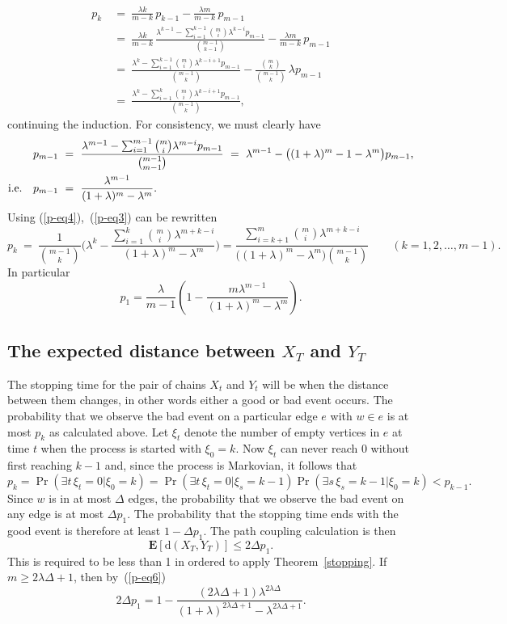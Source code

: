 \documentclass[11pt]{article}
\theoremstyle{definition}
\theoremstyle{remark}
\newcommand{\e}{\mathbf{E}}
\begin{document}
\begin{align*}
    p_k\ &=\ \frac{\lambda k}{m-k}\, p_{k-1}-\frac{\lambda m}{m-k}\,p_{m-1}\\
    &=\ \frac{\lambda k}{m-k}\, \frac{\lambda^{k-1}-\sum_{i=1}^{k-1}
    \binom{m}{i}\lambda^{k-i}p_{m-1}}{\binom{m-1}{k-1}}-\frac{\lambda m}{m-k}\,p_{m-1}\\
    &=\ \frac{\lambda^k-\sum_{i=1}^{k-1} \binom{m}{i}\lambda^{k-i+1}p_{m-1}}{\binom{m-1}{k}}
    - \frac{\binom{m}{k}}{\binom{m-1}{k}}\,\lambda p_{m-1}\\
    &=\ \frac{\lambda^k-\sum_{i=1}^{k} \binom{m}{i}\lambda^{k-i+1}p_{m-1}}{\binom{m-1}{k}},
\end{align*}
continuing the induction. For consistency, we must clearly have
\begin{align}
    p_{m-1}\ &=\ \frac{\lambda^{m-1}-\sum_{i=1}^{m-1}
    \binom{m}{i}\lambda^{m-i}p_{m-1}}{\binom{m-1}{m-1}}
    \ =\ \lambda^{m-1}-\big((1+\lambda)^m-1-\lambda^m\big)p_{m-1},\notag\\
    \textrm{i.e.}\quad p_{m-1}\ &=\ \frac{\lambda^{m-1}}{(1+\lambda)^m-\lambda^m}.\label{p-eq4}
\end{align}%
Using (\ref{p-eq4}),~(\ref{p-eq3}) can be rewritten
\begin{equation}\label{p-eq5}
    p_k\ =\ \frac{1}{\binom{m-1}{k}}\bigg(\lambda^k-\frac{\sum_{i=1}^k
    \binom{m}{i}\lambda^{m+k-i}}{(1+\lambda)^m-\lambda^m}\bigg)
    = \frac{\sum_{i=k+1}^m \binom{m}{i}\lambda^{m+k-i}}
    {\big((1+\lambda)^m-\lambda^m\big)\binom{m-1}{k}}
\qquad(k=1,2,\ldots,m-1).
\end{equation}%
In particular
\begin{equation}\label{p-eq6}
p_1= \frac{\lambda}{m-1}\left(1-\frac{m\lambda^{m-1}}
{(1+\lambda)^m-\lambda^m}\right).
\end{equation}

\subsection{The expected distance between $X_T$ and $Y_T$}
The stopping time for the pair of chains $X_t$ and $Y_t$ will be when the
distance between them changes, in other words either a good or bad event
occurs. The probability that we observe the bad event on a particular edge
$e$ with $w\in e$ is at most $p_k$ as calculated above. Let $\xi_t$ denote
the number of empty vertices in $e$ at time $t$ when the process is started
with $\xi_0=k$. Now $\xi_t$ can never reach 0 without first reaching $k-1$
and, since the process is Markovian, it follows that
\[p_k= \Pr(\exists t\, \xi_t=0 | \xi_0=k)
= \Pr(\exists t\,\xi_t=0 | \xi_{s}=k-1)\Pr(\exists s\,\xi_{s}=k-1 | \xi_{0}=k)
< p_{k-1}.\]%
Since $w$ is in at most $\Delta$ edges, the probability that we observe the
bad event on any edge is at most $\Delta p_1$. The probability that the
stopping time ends with the good event is therefore at least $1-\Delta
p_1$.  The path coupling
calculation is then%
\[\e[\mathrm{d}(X_T,Y_T)]\leq 2\Delta p_1.\]
This is required to be less than 1 in ordered to apply
Theorem~\ref{stopping}. If $m \geq 2\lambda\Delta+1$, then by~(\ref{p-eq6})
\[2\Delta p_1=1-\frac{(2\lambda\Delta+1)\lambda^{2\lambda\Delta}}
{(1+\lambda)^{2\lambda\Delta+1}-\lambda^{2\lambda\Delta+1}}.\]
\end{document}
